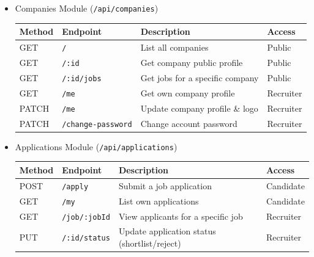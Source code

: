\documentclass[a4paper, 14pt, openany]{extreport}
\begin{document}
\begin{itemize}
		\item Companies Module (\texttt{/api/companies})
		\begin{center}
		\footnotesize
		\begin{tabularx}{\linewidth}{|l|l|X|l|}
		\hline
		\textbf{Method} & \textbf{Endpoint} & \textbf{Description} & \textbf{Access} \\\hline
		GET & \texttt{/} & List all companies & Public \\\hline
		GET & \texttt{/:id} & Get company public profile & Public \\\hline
		GET & \texttt{/:id/jobs} & Get jobs for a specific company & Public \\\hline
		GET & \texttt{/me} & Get own company profile & Recruiter \\\hline
		PATCH & \texttt{/me} & Update company profile \& logo & Recruiter \\\hline
		PATCH & \texttt{/change-password} & Change account password & Recruiter \\\hline
		\end{tabularx}
		\end{center}

		\item Applications Module (\texttt{/api/applications})
		\begin{center}
		\footnotesize
		\begin{tabularx}{\linewidth}{|l|l|X|l|}
		\hline
		\textbf{Method} & \textbf{Endpoint} & \textbf{Description} & \textbf{Access} \\\hline
		POST & \texttt{/apply} & Submit a job application & Candidate \\\hline
		GET & \texttt{/my} & List own applications & Candidate \\\hline
		GET & \texttt{/job/:jobId} & View applicants for a specific job & Recruiter \\\hline
		PUT & \texttt{/:id/status} & Update application status (shortlist/reject) & Recruiter \\\hline
		\end{tabularx}
		\end{center}


\end{itemize}
\end{document}
